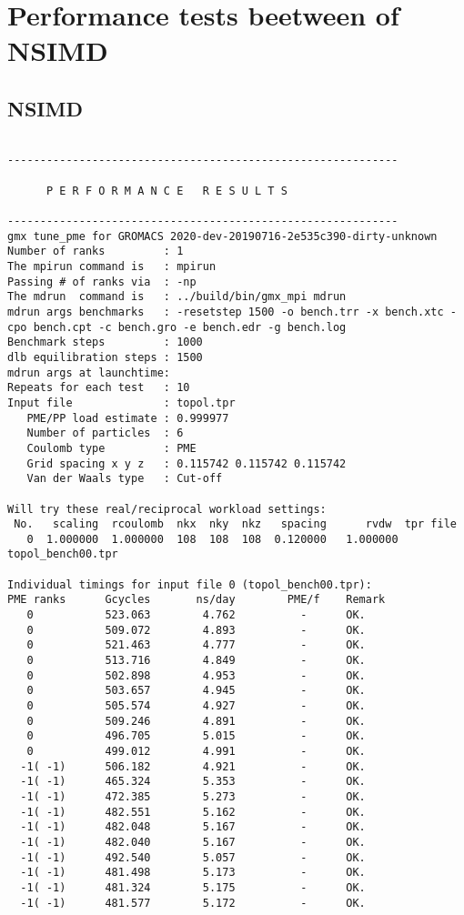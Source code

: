 \documentclass[12pt,a4paper,french]{article}
\begin{document}
\maketitle
\section{Performance tests beetween of NSIMD}
\subsection{NSIMD}
\begin{lstlisting}[frame=single]

------------------------------------------------------------

      P E R F O R M A N C E   R E S U L T S

------------------------------------------------------------
gmx tune_pme for GROMACS 2020-dev-20190716-2e535c390-dirty-unknown
Number of ranks         : 1
The mpirun command is   : mpirun
Passing # of ranks via  : -np
The mdrun  command is   : ../build/bin/gmx_mpi mdrun
mdrun args benchmarks   : -resetstep 1500 -o bench.trr -x bench.xtc -cpo bench.cpt -c bench.gro -e bench.edr -g bench.log 
Benchmark steps         : 1000
dlb equilibration steps : 1500
mdrun args at launchtime: 
Repeats for each test   : 10
Input file              : topol.tpr
   PME/PP load estimate : 0.999977
   Number of particles  : 6
   Coulomb type         : PME
   Grid spacing x y z   : 0.115742 0.115742 0.115742
   Van der Waals type   : Cut-off

Will try these real/reciprocal workload settings:
 No.   scaling  rcoulomb  nkx  nky  nkz   spacing      rvdw  tpr file
   0  1.000000  1.000000  108  108  108  0.120000   1.000000  topol_bench00.tpr

Individual timings for input file 0 (topol_bench00.tpr):
PME ranks      Gcycles       ns/day        PME/f    Remark
   0           523.063        4.762          -      OK.
   0           509.072        4.893          -      OK.
   0           521.463        4.777          -      OK.
   0           513.716        4.849          -      OK.
   0           502.898        4.953          -      OK.
   0           503.657        4.945          -      OK.
   0           505.574        4.927          -      OK.
   0           509.246        4.891          -      OK.
   0           496.705        5.015          -      OK.
   0           499.012        4.991          -      OK.
  -1( -1)      506.182        4.921          -      OK.
  -1( -1)      465.324        5.353          -      OK.
  -1( -1)      472.385        5.273          -      OK.
  -1( -1)      482.551        5.162          -      OK.
  -1( -1)      482.048        5.167          -      OK.
  -1( -1)      482.040        5.167          -      OK.
  -1( -1)      492.540        5.057          -      OK.
  -1( -1)      481.498        5.173          -      OK.
  -1( -1)      481.324        5.175          -      OK.
  -1( -1)      481.577        5.172          -      OK.


\end{lstlisting}
\end{document}
